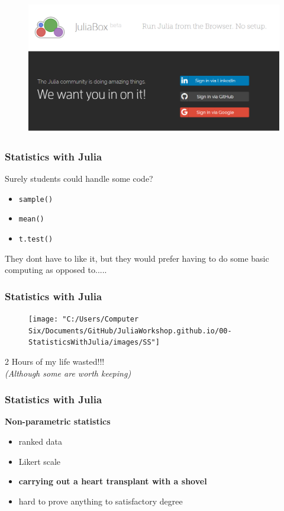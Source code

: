 \documentclass[Master.tex]{subfiles}
\begin{document}
\begin{frame}
	\begin{figure}
\centering
\includegraphics[width=0.98\linewidth]{images/JuliaBox}
\caption{}
\label{fig:JuliaBox}
\end{figure}

\end{frame}
\begin{frame}
	\frametitle{Statistics with Julia}
	\large
	
	Surely students could handle some code?
	
	\begin{itemize}
		\item \texttt{sample()}
		\item \texttt{mean()}
		\item \texttt{t.test()}
		
	\end{itemize}
	
	They dont have to like it, but they would prefer having to do some basic computing as opposed to.....
\end{frame}	
\begin{frame}
	\frametitle{Statistics with Julia}
	\large
	\begin{figure}
\centering
\texttt{[image: "C:/Users/Computer Six/Documents/GitHub/JuliaWorkshop.github.io/00-StatisticsWithJulia/images/SS"]}
\end{figure}

2 Hours of my life wasted!!!\\
\textit{(Although some are worth keeping)}

\end{frame}	
\begin{frame}
\frametitle{Statistics with Julia}
\large
\textbf{Non-parametric statistics}
		
\begin{itemize}		
\item ranked data
\item Likert scale
\item \textbf{carrying out a heart transplant with a shovel}
\item hard to prove anything to satisfactory degree
\end{itemize}
\end{frame}
\end{document}
